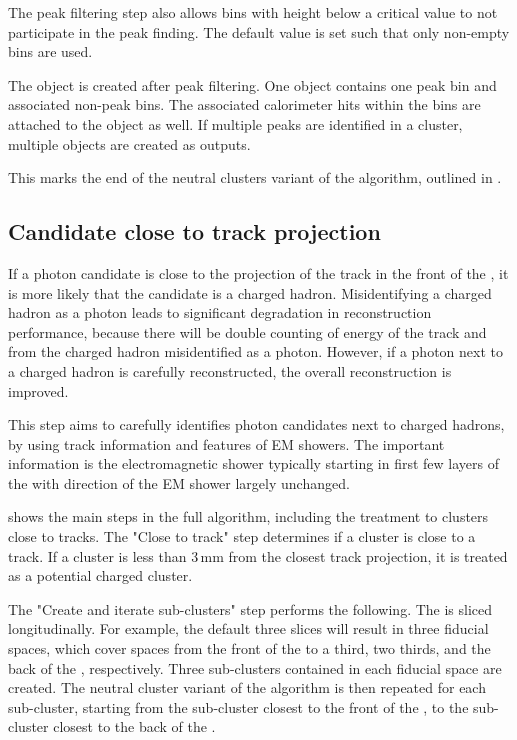 The peak filtering step also allows bins with height below a critical value to not participate in the peak finding. The default value is set such that only non-empty bins are used.

The \ShowerPeak  object is created after peak filtering. One \ShowerPeak object contains one peak bin and associated non-peak bins. The associated calorimeter hits within the bins are attached to the \ShowerPeak object as well. If multiple peaks are identified in a cluster, multiple \ShowerPeak objects are created as outputs.

This marks the end of the neutral clusters variant of the \PhotonReconstruction algorithm, outlined in . 


\subsection{Candidate close to track projection}
\label{sec:photon2Dtrack}
If  a photon candidate is close to the projection of the track in the front of the \ECAL, it is more likely that the candidate is a charged hadron. Misidentifying a charged hadron as a photon leads to significant degradation in reconstruction performance, because there will be double counting of energy of the track and from the charged hadron misidentified as a photon. However, if a photon next to a charged hadron is carefully reconstructed, the overall reconstruction is improved. 

This step aims to carefully identifies photon candidates next to charged hadrons, by using track information and features of EM showers. The important information is the electromagnetic shower typically starting in first few layers of the \ECAL with direction of the EM shower largely unchanged.


 shows the main steps in the full \peakFinding algorithm, including the treatment to clusters close to tracks. The "Close to track" step determines if a cluster is close to a track. If a cluster is less than 3\,mm from the closest track projection, it is treated as a potential charged cluster.



The "Create and iterate sub-clusters" step performs the following. The \ECAL is sliced longitudinally. For example, the default three slices will result in three \ECAL fiducial spaces, which cover spaces from the front of the \ECAL to a third, two thirds, and the back of the \ECAL, respectively. Three sub-clusters contained in each fiducial space are created. The neutral cluster variant of the  \peakFinding algorithm is then repeated for each sub-cluster, starting from the sub-cluster closest to the front of the \ECAL, to the sub-cluster closest to the back of the \ECAL.

